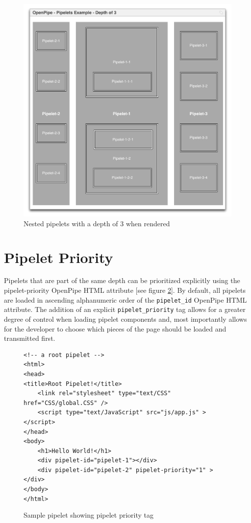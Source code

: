 \documentclass[12pt]{report}
\begin{document}
\begin{figure}[H]
\centering
\includegraphics[width=\textwidth,keepaspectratio]{figures/images/nested_pipelets.pdf}
\caption{Nested pipelets with a depth of 3 when rendered}
\label{fig:nestedPipelets}
\end{figure}

\section{Pipelet Priority}
Pipelets that are part of the same depth can be prioritized explicitly using the pipelet-priority OpenPipe HTML attribute [see figure \ref{fig:pipeletPriority}]. By default, all pipelets are loaded in ascending alphanumeric order of the \texttt{pipelet\_id} OpenPipe HTML attribute. The addition of an explicit \texttt{pipelet\_priority} tag allows for a greater degree of control when loading pipelet components and, most importantly allows for the developer to choose which pieces of the page should be loaded and transmitted first.

\begin{figure}[H]
\begin{lstlisting}
<!-- a root pipelet -->
<html>
<head>
<title>Root Pipelet!</title>
	<link rel="stylesheet" type="text/CSS" href="CSS/global.CSS" />
	<script type="text/JavaScript" src="js/app.js" ></script>
</head>
<body>
	<h1>Hello World!</h1>
	<div pipelet-id="pipelet-1"></div>
	<div pipelet-id="pipelet-2" pipelet-priority="1" ></div>
</body>
</html>
\end{lstlisting}
\caption{Sample pipelet showing pipelet priority tag}
\label{fig:pipeletPriority}
\end{figure}
\end{document}
